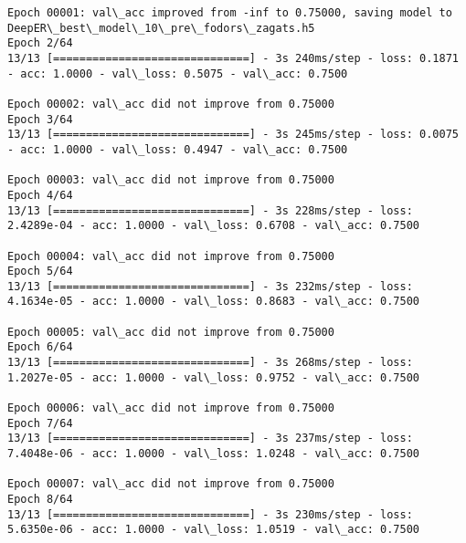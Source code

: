 \documentclass[11pt]{article}
\begin{document}
\begin{Verbatim}[commandchars=\\\{\}]
Epoch 00001: val\_acc improved from -inf to 0.75000, saving model to DeepER\_best\_model\_10\_pre\_fodors\_zagats.h5
Epoch 2/64
13/13 [==============================] - 3s 240ms/step - loss: 0.1871 - acc: 1.0000 - val\_loss: 0.5075 - val\_acc: 0.7500

Epoch 00002: val\_acc did not improve from 0.75000
Epoch 3/64
13/13 [==============================] - 3s 245ms/step - loss: 0.0075 - acc: 1.0000 - val\_loss: 0.4947 - val\_acc: 0.7500

Epoch 00003: val\_acc did not improve from 0.75000
Epoch 4/64
13/13 [==============================] - 3s 228ms/step - loss: 2.4289e-04 - acc: 1.0000 - val\_loss: 0.6708 - val\_acc: 0.7500

Epoch 00004: val\_acc did not improve from 0.75000
Epoch 5/64
13/13 [==============================] - 3s 232ms/step - loss: 4.1634e-05 - acc: 1.0000 - val\_loss: 0.8683 - val\_acc: 0.7500

Epoch 00005: val\_acc did not improve from 0.75000
Epoch 6/64
13/13 [==============================] - 3s 268ms/step - loss: 1.2027e-05 - acc: 1.0000 - val\_loss: 0.9752 - val\_acc: 0.7500

Epoch 00006: val\_acc did not improve from 0.75000
Epoch 7/64
13/13 [==============================] - 3s 237ms/step - loss: 7.4048e-06 - acc: 1.0000 - val\_loss: 1.0248 - val\_acc: 0.7500

Epoch 00007: val\_acc did not improve from 0.75000
Epoch 8/64
13/13 [==============================] - 3s 230ms/step - loss: 5.6350e-06 - acc: 1.0000 - val\_loss: 1.0519 - val\_acc: 0.7500


\end{Verbatim}
\end{document}
